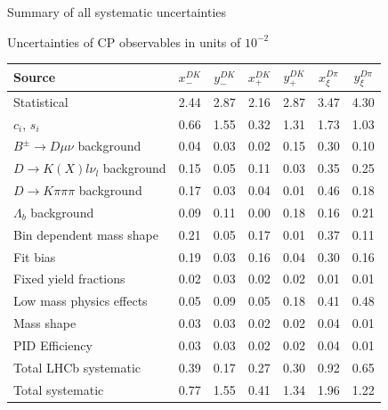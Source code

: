 \documentclass{beamer}
\begin{document}
\begin{frame}{Summary of all systematic uncertainties}
  \vspace{-0.3cm}
  \begin{center}
    Uncertainties of CP observables in units of $10^{-2}$
  \end{center}
  \vspace{0.02cm}
  \begin{tabular}{lcccccc} 
        \hline
        Source & $x_-^{DK}$ & $y_-^{DK}$ & $x_+^{DK}$ & $y_+^{DK}$ & $x_\xi^{D\pi}$ & $y_\xi^{D\pi}$ \\
        \hline
        Statistical                              & 2.44  & 2.87  & 2.16  & 2.87  & 3.47  & 4.30  \\
        \hline
        $c_i$, $s_i$                             & 0.66  & 1.55  & 0.32  & 1.31  & 1.73  & 1.03  \\
        \hline
        $B^\pm\to D\mu\nu$ background            & 0.04  & 0.03  & 0.02  & 0.15  & 0.30  & 0.10 \\
        $D\to K(X)l\nu_l$ background             & 0.15  & 0.05  & 0.11  & 0.03  & 0.35  & 0.25 \\
        $D\to K\pi\pi\pi$ background             & 0.17  & 0.03  & 0.04  & 0.01  & 0.46  & 0.18 \\
        $\Lambda_b$ background                   & 0.09  & 0.11  & 0.00  & 0.18  & 0.16  & 0.21 \\
        Bin dependent mass shape                 & 0.21  & 0.05  & 0.17  & 0.01  & 0.37  & 0.11 \\
        Fit bias                                 & 0.19  & 0.03  & 0.16  & 0.04  & 0.30  & 0.16 \\
        Fixed yield fractions                    & 0.02  & 0.03  & 0.02  & 0.02  & 0.01  & 0.01 \\
        Low mass physics effects                 & 0.05  & 0.09  & 0.05  & 0.18  & 0.41  & 0.48 \\
        Mass shape                               & 0.03  & 0.03  & 0.02  & 0.02  & 0.04  & 0.01 \\
        PID Efficiency                           & 0.03  & 0.03  & 0.02  & 0.02  & 0.04  & 0.01 \\
        \hline
        Total LHCb systematic                    & 0.39  & 0.17  & 0.27  & 0.30  & 0.92  & 0.65  \\
        \hline
        Total systematic                         & 0.77  & 1.55  & 0.41  & 1.34  & 1.96  & 1.22  \\
        \hline
  \end{tabular}
\end{frame}
\end{document}
